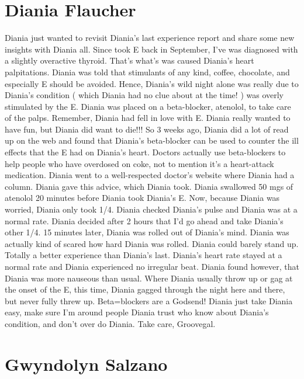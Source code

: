 \documentclass[12pt]{book}
\begin{document}
\chapter{Diania Flaucher}

Diania just wanted to revisit Diania's last experience report and share some new insights with Diania all. Since took E back in September, I've was diagnosed with a slightly overactive thyroid. That's what's was caused Diania's heart palpitations. Diania was told that stimulants of any kind, coffee, chocolate, and especially E should be avoided. Hence, Diania's wild night alone was really due to Diania's condition ( which Diania had no clue about at the time! ) was overly stimulated by the E. Diania was placed on a beta-blocker, atenolol, to take care of the palps. Remember, Diania had fell in love with E. Diania really wanted to have fun, but Diania did want to die!!! So 3 weeks ago, Diania did a lot of read up on the web and found that Diania's beta-blocker can be used to counter the ill effects that the E had on Diania's heart. Doctors actually use beta-blockers to help people who have overdosed on coke, not to mention it's a heart-attack medication. Diania went to a well-respected doctor's website where Diania had a column. Diania gave this advice, which Diania took. Diania swallowed 50 mgs of atenolol 20 minutes before Diania took Diania's E. Now, because Diania was worried, Diania only took 1/4. Diania checked Diania's pulse and Diania was at a normal rate. Diania decided after 2 hours that I'd go ahead and take Diania's other 1/4. 15 minutes later, Diania was rolled out of Diania's mind. Diania was actually kind of scared how hard Diania was rolled. Diania could barely stand up. Totally a better experience than Diania's last. Diania's heart rate stayed at a normal rate and Diania experienced no irregular beat. Diania found however, that Diania was more nauseous than usual. Where Diania usually throw up or gag at the onset of the E, this time, Diania gagged through the night here and there, but never fully threw up. Beta=blockers are a Godsend! Diania just take Diania easy, make sure I'm around people Diania trust who know about Diania's condition, and don't over do Diania. Take care, Groovegal.






\chapter{Gwyndolyn Salzano}
\end{document}
